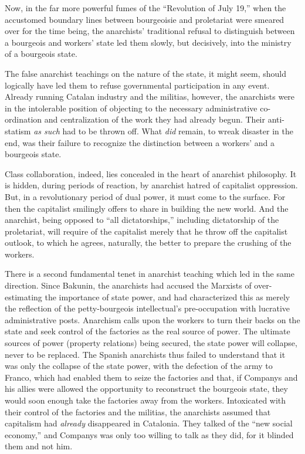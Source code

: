 Now, in the far more powerful fumes of the ``Revolution of July 19,'' when the accustomed boundary lines between bourgeoisie and proletariat were smeared over for the time being, the anarchists’ traditional refusal to distinguish between a bourgeois and workers’ state led them slowly, but decisively, into the ministry of a bourgeois state.

The false anarchist teachings on the nature of the state, it might seem, should logically have led them to refuse governmental participation in any event. Already running Catalan industry and the militias, however, the anarchists were in the intolerable position of objecting to the necessary administrative co-ordination and centralization of the work they had already begun. Their anti-statism \emph{as such} had to be thrown off. What \emph{did} remain, to wreak disaster in the end, was their failure to recognize the distinction between a workers’ and a bourgeois state.

Class collaboration, indeed, lies concealed in the heart of anarchist philosophy. It is hidden, during periods of reaction, by anarchist hatred of capitalist oppression. But, in a revolutionary period of dual power, it must come to the surface. For then the capitalist smilingly offers to share in building the new world. And the anarchist, being opposed to ``all dictatorships,'' including dictatorship of the proletariat, will require of the capitalist merely that he throw off the capitalist outlook, to which he agrees, naturally, the better to prepare the crushing of the workers.

There is a second fundamental tenet in anarchist teaching which led in the same direction. Since Bakunin, the anarchists had accused the Marxists of over-estimating the importance of state power, and had characterized this as merely the reflection of the petty-bourgeois intellectual’s pre-occupation with lucrative administrative posts. Anarchism calls upon the workers to turn their backs on the state and seek control of the factories as the real source of power. The ultimate sources of power (property relations) being secured, the state power will collapse, never to be replaced. The Spanish anarchists thus failed to understand that it was only the collapse of the state power, with the defection of the army to Franco, which had enabled them to seize the factories and that, if Companys and his allies were allowed the opportunity to reconstruct the bourgeois state, they would soon enough take the factories away from the workers. Intoxicated with their control of the factories and the militias, the anarchists assumed that capitalism had \emph{already} disappeared in Catalonia. They talked of the ``new social economy,'' and Companys was only too willing to talk as they did, for it blinded them and not him.

